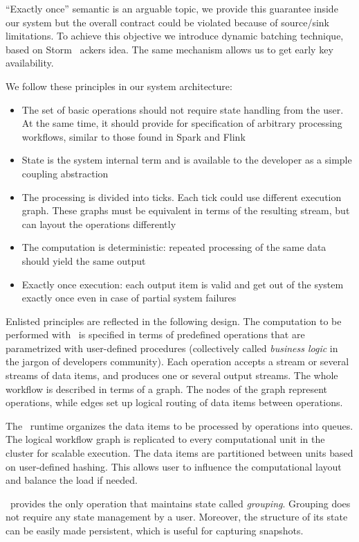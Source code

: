``Exactly once'' semantic is an arguable topic, we provide this guarantee inside our system but the overall contract could be violated because of source/sink limitations. To achieve this objective we introduce dynamic batching technique, based on Storm~\cite{apache:storm} ackers idea. The same mechanism allows us to get early key availability.

We follow these principles in our system architecture:
\begin{itemize}
\item The set of basic operations should not require state handling from the user. At the same time, it should provide for specification of arbitrary processing workflows, similar to those found in Spark and Flink
\item State is the system internal term and is available to the developer as a simple coupling abstraction
\item The processing is divided into ticks. Each tick could use different execution graph. These graphs must be equivalent in terms of the resulting stream, but can layout the operations differently
\item The computation is deterministic: repeated processing of the same data should yield the same output
\item Exactly once execution: each output item is valid and get out of the system exactly once even in case of partial system failures
\end{itemize}

Enlisted principles are reflected in the following design. The computation to be performed with \FlameStream\ is specified in terms of predefined operations that are parametrized with user-defined procedures (collectively called {\em business logic} in the jargon of developers community). Each operation accepts a stream or several streams of data items, and produces one or several output streams. The whole workflow is described in terms of a graph. The nodes of the graph represent operations, while edges set up logical routing of data items between operations.

The \FlameStream\ runtime organizes the data items to be processed by operations into queues. The logical workflow graph is replicated to every computational unit in the cluster for scalable execution. The data items are partitioned between units based on user-defined hashing. This allows user to influence the computational layout and balance the load if needed.

\FlameStream\ provides the only operation that maintains state called {\it grouping}. Grouping does not require any state management by a user. Moreover, the structure of its state can be easily made persistent, which is useful for capturing snapshots.

